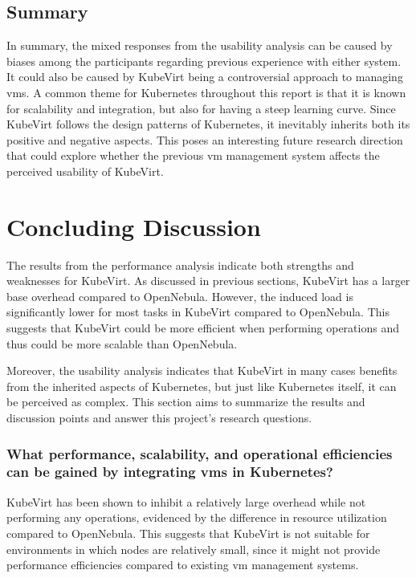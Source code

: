 \documentclass{kththesis}
\begin{document}
\begin{enumerate}
\subsection{Summary}
In summary, the mixed responses from the usability analysis can be caused by biases among the participants regarding previous experience with either system. It could also be caused by KubeVirt being a controversial approach to managing \Glspl{vm}. A common theme for Kubernetes throughout this report is that it is known for scalability and integration, but also for having a steep learning curve. Since KubeVirt follows the design patterns of Kubernetes, it inevitably inherits both its positive and negative aspects. This poses an interesting future research direction that could explore whether the previous \Gls{vm} management system affects the perceived usability of KubeVirt.

\section{Concluding Discussion}
The results from the performance analysis indicate both strengths and weaknesses for KubeVirt. As discussed in previous sections, KubeVirt has a larger base overhead compared to OpenNebula. However, the induced load is significantly lower for most tasks in KubeVirt compared to OpenNebula. This suggests that KubeVirt could be more efficient when performing operations and thus could be more scalable than OpenNebula. 

Moreover, the usability analysis indicates that KubeVirt in many cases benefits from the inherited aspects of Kubernetes, but just like Kubernetes itself, it can be perceived as complex. This section aims to summarize the results and discussion points and answer this project's research questions. 

\subsubsection*{What performance, scalability, and operational efficiencies can be gained by integrating \Glspl{vm} in Kubernetes?}
KubeVirt has been shown to inhibit a relatively large overhead while not performing any operations, evidenced by the difference in resource utilization compared to OpenNebula. This suggests that KubeVirt is not suitable for environments in which nodes are relatively small, since it might not provide performance efficiencies compared to existing \Gls{vm} management systems. 


\end{enumerate}
\end{document}
